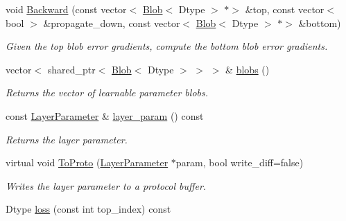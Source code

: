 \begin{DoxyCompactItemize}
void \mbox{\hyperlink{classcaffe_1_1_layer_a183d343f5183a4762307f2c5e6ed1e12}{Backward}} (const vector$<$ \mbox{\hyperlink{classcaffe_1_1_blob}{Blob}}$<$ Dtype $>$ $\ast$$>$ \&top, const vector$<$ bool $>$ \&propagate\+\_\+down, const vector$<$ \mbox{\hyperlink{classcaffe_1_1_blob}{Blob}}$<$ Dtype $>$ $\ast$$>$ \&bottom)
\begin{DoxyCompactList}\small\item\em Given the top blob error gradients, compute the bottom blob error gradients. \end{DoxyCompactList}\item 
\mbox{\label{classcaffe_1_1_layer_aaf4524ce8641a30a8a4784aee1b2b4c8}} 
vector$<$ shared\+\_\+ptr$<$ \mbox{\hyperlink{classcaffe_1_1_blob}{Blob}}$<$ Dtype $>$ $>$ $>$ \& \mbox{\hyperlink{classcaffe_1_1_layer_aaf4524ce8641a30a8a4784aee1b2b4c8}{blobs}} ()
\begin{DoxyCompactList}\small\item\em Returns the vector of learnable parameter blobs. \end{DoxyCompactList}\item 
\mbox{\label{classcaffe_1_1_layer_adff82274f146e2b6922d0ebac2aaf215}} 
const \mbox{\hyperlink{classcaffe_1_1_layer_parameter}{Layer\+Parameter}} \& \mbox{\hyperlink{classcaffe_1_1_layer_adff82274f146e2b6922d0ebac2aaf215}{layer\+\_\+param}} () const
\begin{DoxyCompactList}\small\item\em Returns the layer parameter. \end{DoxyCompactList}\item 
\mbox{\label{classcaffe_1_1_layer_a4a1754828dda22cc8daa2f63377f3579}} 
virtual void \mbox{\hyperlink{classcaffe_1_1_layer_a4a1754828dda22cc8daa2f63377f3579}{To\+Proto}} (\mbox{\hyperlink{classcaffe_1_1_layer_parameter}{Layer\+Parameter}} $\ast$param, bool write\+\_\+diff=false)
\begin{DoxyCompactList}\small\item\em Writes the layer parameter to a protocol buffer. \end{DoxyCompactList}\item 
\mbox{\label{classcaffe_1_1_layer_a899410336f30821644c8bd6c69a070c9}} 
Dtype \mbox{\hyperlink{classcaffe_1_1_layer_a899410336f30821644c8bd6c69a070c9}{loss}} (const int top\+\_\+index) const

\end{DoxyCompactItemize}
